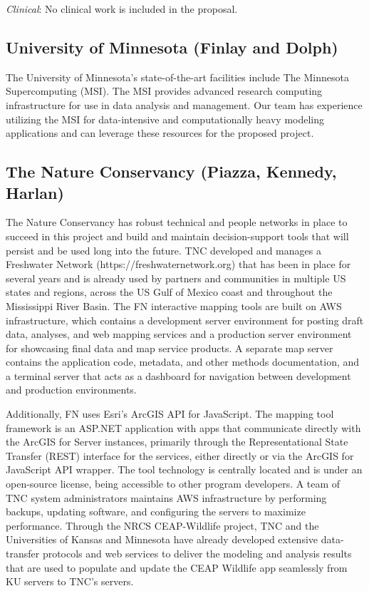 \documentclass[12pt, class=article, crop=false]{standalone}
\begin{document}
\textit{Clinical}: No clinical work is included in the proposal.

\subsection*{University of Minnesota (Finlay and Dolph)}

The University of Minnesota's state-of-the-art facilities include The Minnesota Supercomputing (MSI).
The MSI provides advanced research computing infrastructure for use in data analysis and management.
Our team has experience utilizing the MSI for data-intensive and computationally heavy modeling applications and can leverage these resources for the proposed project. 

\subsection*{The Nature Conservancy (Piazza, Kennedy, Harlan)}

The Nature Conservancy has robust technical and people networks in place to succeed in this project and build and maintain decision-support tools that will persist and be used long into the future.
TNC developed and manages a Freshwater Network (https://freshwaternetwork.org) that has been in place for several years and is already used by partners and communities in multiple US states and regions, across the US Gulf of Mexico coast and throughout the Mississippi River Basin.
The FN interactive mapping tools are built on AWS infrastructure, which contains a development server environment for posting draft data, analyses, and web mapping services and a production server environment for showcasing final data and map service products.
A separate map server contains the application code, metadata, and other methods documentation, and a terminal server that acts as a dashboard for navigation between development and production environments.

Additionally, FN uses Esri's ArcGIS API for JavaScript.
The mapping tool framework is an ASP.NET application with apps that communicate directly with the ArcGIS for Server instances, primarily through the Representational State Transfer (REST) interface for the services, either directly or via the ArcGIS for JavaScript API wrapper.
The tool technology is centrally located and is under an open-source license, being accessible to other program developers.
A team of TNC system administrators maintains AWS infrastructure by performing backups, updating software, and configuring the servers to maximize performance.
Through the NRCS CEAP-Wildlife project, TNC and the Universities of Kansas and Minnesota have already developed extensive data-transfer protocols and web services to deliver the modeling and analysis results that are used to populate and update the CEAP Wildlife app seamlessly from KU servers to TNC's servers. 
\end{document}
